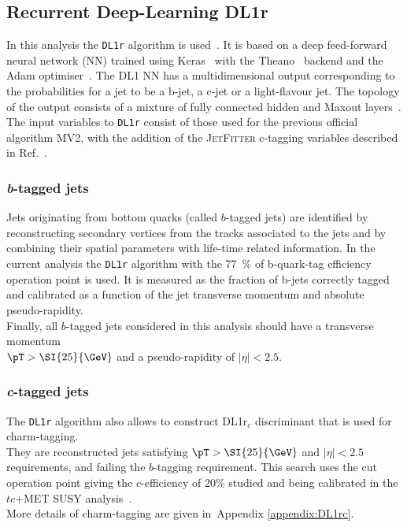\subsection{Recurrent Deep-Learning DL1r}
In this analysis the \texttt{DL1r} algorithm is used~\cite{ATL-PHYS-PUB-2017-013,Aad:2019aic}.
It is based on a deep feed-forward neural network (NN) trained using Keras~\cite{keras} with the Theano~\cite{theano} backend and the Adam optimiser~\cite{adam}. The DL1 NN has a multidimensional output corresponding to the probabilities for a jet to be a b-jet, a c-jet or a light-flavour jet. The topology of the output consists of a mixture of fully connected hidden and Maxout layers~\cite{goodfellow2013maxout}. The input variables to \texttt{DL1r} consist of those used for the previous official algorithm MV2, with the addition of the \textsc{JetFitter} c-tagging variables described in Ref.~\cite{Aad:2019aic}.
\subsubsection {\textit{b}-tagged jets}
\label{sec:object:bjet}
Jets originating from bottom quarks (called $b$-tagged jets) are
identified by reconstructing secondary vertices from the tracks
associated to the jets and by combining their spatial parameters with
life-time related information.
In the current analysis the \texttt{DL1r} algorithm with the \SI{77}{\%} of b-quark-tag efficiency operation point is used. It is measured as the fraction of b-jets correctly tagged and calibrated as a function of the jet transverse momentum and absolute pseudo-rapidity.\\
Finally, all $b$-tagged jets considered in this analysis should have a transverse
momentum\\ $\pT >\SI{25}{\GeV}$ and a pseudo-rapidity of
$|\eta|\!<\!2.5$.  
\subsubsection {\textit{c}-tagged jets}
\label{sec:object:cjet}
The \texttt{DL1r} algorithm also allows to construct DL1r$_{c}$ discriminant that is used for charm-tagging.\\
They are reconstructed jets satisfying $\pT > \SI{25}{\GeV}$ and $|\eta| < 2.5$ requirements,
and failing the $b$-tagging requirement.
This search uses the cut operation point giving the $c$-efficiency of 20\% studied and being calibrated
in the $tc$+MET SUSY analysis~\cite{ANA-SUSY-2019-23}.\\
More details of charm-tagging are given in~Appendix \ref{appendix:DL1rc}.

